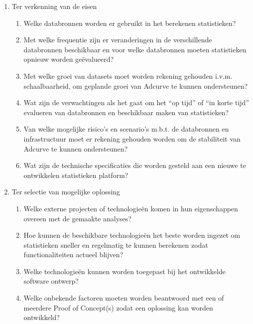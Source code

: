 \begin{enumerate}
\item Ter verkenning van de eisen
    \begin{enumerate}
    \item Welke databronnen worden er gebruikt in het berekenen statistieken?

    \item Met welke frequentie zijn er veranderingen in de verschillende databronnen beschikbaar en voor welke databronnen moeten statistieken opnieuw worden geëvalueerd?

    \item Met welke groei van datasets moet worden rekening gehouden i.v.m. schaalbaarheid, om geplande groei van Adcurve te kunnen ondersteunen?

    \item Wat zijn de verwachtingen als het gaat om het “op tijd” of “in korte tijd” evalueren van databronnen en beschikbaar maken van statistieken?

    \item Van welke mogelijke risico’s en scenario’s m.b.t. de databronnen en infrastructuur moet er rekening gehouden worden om de stabiliteit van Adcurve te kunnen ondersteunen?

    \item Wat zijn de technische specificaties die worden gesteld aan een nieuwe te ontwikkelen statistieken platform?
    \end{enumerate}

\item Ter selectie van mogelijke oplossing
    \begin{enumerate}

    \item Welke externe projecten of technologieën komen in hun eigenschappen overeen met de gemaakte analyses?

    \item Hoe kunnen de beschikbare technologieën het beste worden ingezet om statistieken sneller en regelmatig te kunnen berekenen zodat functionaliteiten actueel blijven?

    \item Welke technologieën kunnen worden toegepast bij het ontwikkelde software ontwerp?

    \item Welke onbekende factoren moeten worden beantwoord met een of meerdere Proof of Concept(s) zodat een oplossing kan worden ontwikkeld?
    \end{enumerate}
\end{enumerate}


